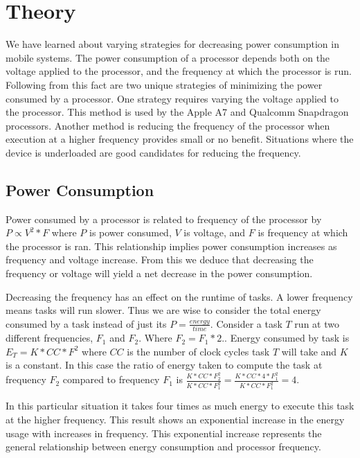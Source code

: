\documentclass{article} %
\begin{document}
\section{Theory}
We have learned about varying strategies for decreasing power consumption in mobile systems. 
The power consumption of a processor depends both on the voltage applied to the processor, and the frequency at which the processor is run. Following from this fact are two unique strategies of minimizing the power consumed by a processor. One strategy requires varying the voltage applied to the processor. This method is used by the Apple A7 and Qualcomm Snapdragon processors. 
Another method is reducing the frequency of the processor when execution at a higher frequency provides small or no benefit. Situations where the device is underloaded are good candidates for reducing the frequency.

\subsection{Power Consumption}
Power consumed by a processor is related to frequency of the processor by $P \propto V^2*F$ where $P$ is power consumed, $V$ is voltage, and $F$ is frequency at which the processor is ran.
This relationship implies power consumption increases as frequency and voltage increase. From this we deduce that decreasing the frequency or voltage will yield a net decrease in the power consumption. 

Decreasing the frequency has an effect on the runtime of tasks. A lower frequency means tasks will run slower. Thus we are wise to consider the total energy consumed by a task instead of just its $P = \frac{energy}{time}$.
Consider a task $T$ run at two different frequencies, $F_{1}$ and $F_{2}$. Where $F_{2} = F_{1}*2.$.
Energy consumed by task is $E_{T} = K*CC*F^2$ where $CC$ is the number of clock cycles task $T$ will take and $K$ is a constant. In this case the ratio of energy taken to compute the task at frequency $F_{2}$ compared to frequency $F_{1}$ is $\frac{K*CC*F_{2}^2}{K*CC*F_{1}^2} = \frac{K*CC*4*F_{1}^2}{K*CC*F_{1}^2} = 4$.

In this particular situation it takes four times as much energy to execute this task at the higher frequency. This result shows an exponential increase in the energy usage with increases in frequency. This exponential increase represents the general relationship between energy consumption and processor frequency.
\end{document}

